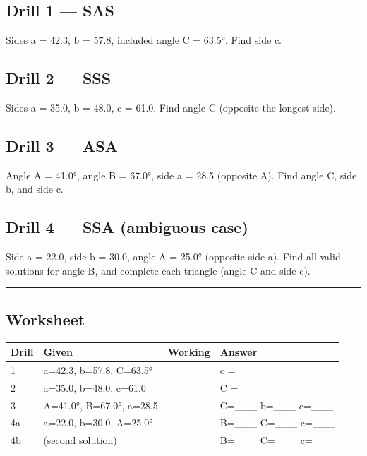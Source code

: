 \documentclass[
  10pt,
]{article}
\begin{document}
\hypertarget{drill-1-sas}{%
\subsection{Drill 1 --- SAS}\label{drill-1-sas}}

Sides a = 42.3, b = 57.8, included angle C = 63.5°. Find side c.

\hypertarget{drill-2-sss}{%
\subsection{Drill 2 --- SSS}\label{drill-2-sss}}

Sides a = 35.0, b = 48.0, c = 61.0. Find angle C (opposite the longest
side).

\hypertarget{drill-3-asa}{%
\subsection{Drill 3 --- ASA}\label{drill-3-asa}}

Angle A = 41.0°, angle B = 67.0°, side a = 28.5 (opposite A). Find angle
C, side b, and side c.

\hypertarget{drill-4-ssa-ambiguous-case}{%
\subsection{Drill 4 --- SSA (ambiguous
case)}\label{drill-4-ssa-ambiguous-case}}

Side a = 22.0, side b = 30.0, angle A = 25.0° (opposite side a). Find
all valid solutions for angle B, and complete each triangle (angle C and
side c).

\begin{center}\rule{0.5\linewidth}{0.5pt}\end{center}

\hypertarget{worksheet}{%
\subsection{Worksheet}\label{worksheet}}

\begin{longtable}[]{@{}llll@{}}
\toprule
Drill & Given & Working & Answer\tabularnewline
\midrule
\endhead
1 & a=42.3, b=57.8, C=63.5° & & c =\tabularnewline
2 & a=35.0, b=48.0, c=61.0 & & C =\tabularnewline
3 & A=41.0°, B=67.0°, a=28.5 & & C=\_\_\_ b=\_\_\_
c=\_\_\_\tabularnewline
4a & a=22.0, b=30.0, A=25.0° & & B=\_\_\_ C=\_\_\_
c=\_\_\_\tabularnewline
4b & (second solution) & & B=\_\_\_ C=\_\_\_ c=\_\_\_\tabularnewline
\bottomrule
\end{longtable}
\end{document}
